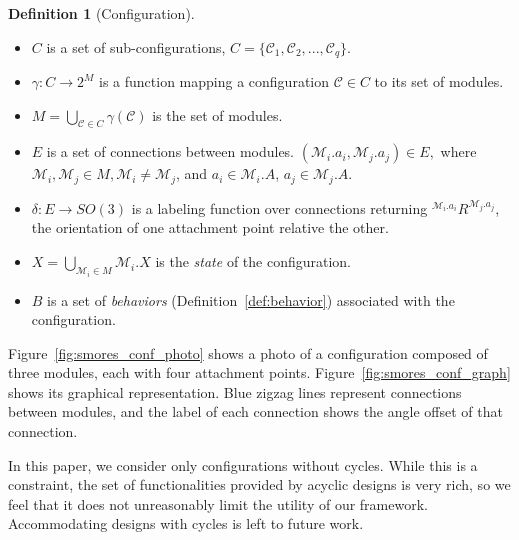 \documentclass[conference]{IEEEtran}
\theoremstyle{definition}
\newtheorem{definition}{Definition}[section]
\begin{document}
\begin{definition}[Configuration]
\begin{itemize}
\item $C$ is a set of sub-configurations, $C=\{\mathcal{C}_{1}, \mathcal{C}_{2}, ..., \mathcal{C}_{q}\}$.
\item $\gamma: C \rightarrow 2^M$ is a function {mapping} a configuration \( \mathcal{C}
\in C\) to its set
of modules.
\item \( M=\bigcup_{\mathcal{C}\in C}{\gamma(\mathcal{C})} \) is the set of modules.
\item $E$ is a set of connections between modules. $(\mathcal{M}_i.a_i, \mathcal{M}_j.a_j)\in E,$ where $\mathcal{M}_{i},\mathcal{M}_j \in M, \mathcal{M}_i \neq \mathcal{M}_j$, and $a_i\in \mathcal{M}_i.A$, $a_j\in \mathcal{M}_j.A$.
\item $\delta: E \rightarrow SO(3)$ is a labeling function over connections returning
\({^{\mathcal{M}_i.a_i}}R^{\mathcal{M}_j.a_j}\), the orientation of one attachment point relative the
other. \item \(X = \displaystyle\bigcup_{\mathcal{M}_i \in M} \mathcal{M}_i.X \) is the \textit{state} of the configuration.
\item \(B\) is a set of \textit{behaviors} (Definition~\ref{def:behavior}) associated with the configuration.
\end{itemize}

Figure~\ref{fig:smores_conf_photo} shows a photo of a configuration composed
of three modules, each with four attachment points.  Figure~\ref{fig:smores_conf_graph} shows its
graphical representation. Blue zigzag lines represent connections between
modules, and the label of each connection shows the angle offset of that
connection.

In this paper, we consider only configurations without cycles. While this is a constraint,
the set of functionalities provided by acyclic designs is very rich, so we feel that
it does not unreasonably limit the utility of our framework. Accommodating designs
with cycles is left to future work.


\end{definition}
\end{document}
